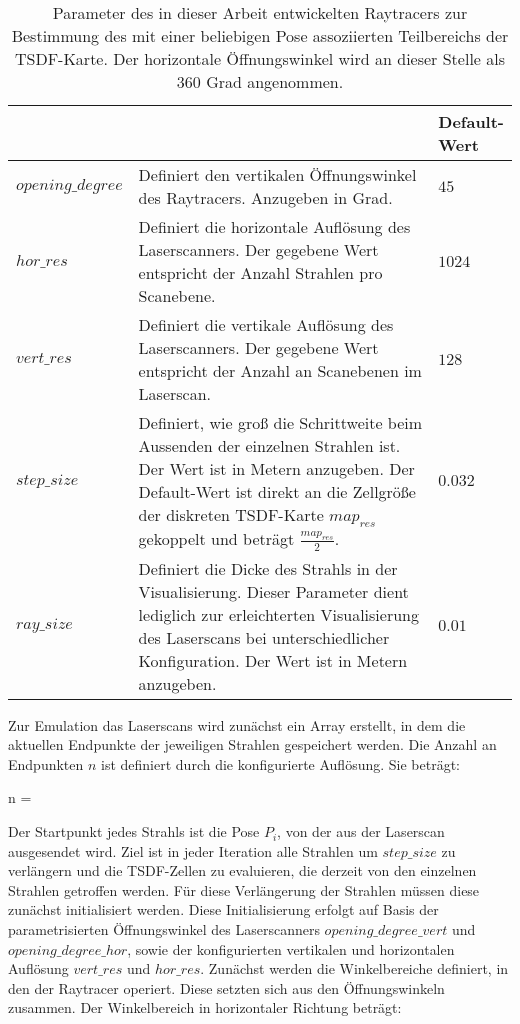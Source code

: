 	\begin{table}
		\centering
		\caption{Parameter des in dieser Arbeit entwickelten Raytracers zur Bestimmung des mit einer beliebigen Pose assoziierten Teilbereichs der TSDF-Karte. Der horizontale Öffnungswinkel wird an dieser Stelle als $360$ Grad angenommen.}
		\begin{tabular}{| p{3cm} | p{8cm} | p{2cm} |}
			\hline
			\thead{Parameter}   & \thead{Funktionsweise}  & \thead{Default-\\Wert}\\
			\hline
			$opening\_degree$   & Definiert den vertikalen Öffnungswinkel des Raytracers. Anzugeben in Grad. & $45$ \\
			\hline
			$hor\_res$     & Definiert die horizontale Auflösung des Laserscanners. Der gegebene Wert  entspricht der Anzahl Strahlen pro Scanebene. & $1024$\\
			\hline			
			$vert\_res$    & Definiert die vertikale Auflösung des Laserscanners. Der gegebene Wert entspricht der Anzahl an Scanebenen im Laserscan. & $128$\\
			\hline			
			$step\_size$      & Definiert, wie groß die Schrittweite beim Aussenden der einzelnen Strahlen ist. Der Wert ist in Metern anzugeben. Der Default-Wert ist direkt an die Zellgröße der diskreten TSDF-Karte $map_{res}$ gekoppelt und beträgt $\frac{map_{res}}{2}$. & $0.032$ \\
			\hline			
			$ray\_size$   & Definiert die Dicke des Strahls in der Visualisierung. Dieser Parameter dient lediglich zur erleichterten Visualisierung des Laserscans bei unterschiedlicher Konfiguration. Der Wert ist in Metern anzugeben. & $0.01$ \\
			\hline
		\end{tabular}
		\label{table:Raytracer_params}
	\end{table}	
	
Zur Emulation das Laserscans wird zunächst ein Array erstellt, in dem die aktuellen Endpunkte der jeweiligen Strahlen gespeichert werden. Die Anzahl an Endpunkten $n$ ist definiert durch die konfigurierte Auflösung. Sie beträgt:

\begin{myequation}
n =  \cdot {}
\end{myequation}

 Der Startpunkt jedes Strahls ist die Pose $P_i$, von der aus der Laserscan ausgesendet wird. Ziel ist in jeder Iteration alle Strahlen um $step\_size$ zu verlängern und die TSDF-Zellen zu evaluieren, die derzeit von den einzelnen Strahlen getroffen werden. Für diese Verlängerung der Strahlen müssen diese zunächst initialisiert werden. Diese Initialisierung erfolgt auf Basis der parametrisierten Öffnungswinkel des Laserscanners $opening\_degree\_vert$ und $opening\_degree\_hor$, sowie der konfigurierten vertikalen und horizontalen Auflösung $vert\_res$ und $hor\_res$.
Zunächst werden die Winkelbereiche definiert, in den der Raytracer operiert. Diese setzten sich aus den Öffnungswinkeln zusammen. Der Winkelbereich in horizontaler Richtung beträgt:

